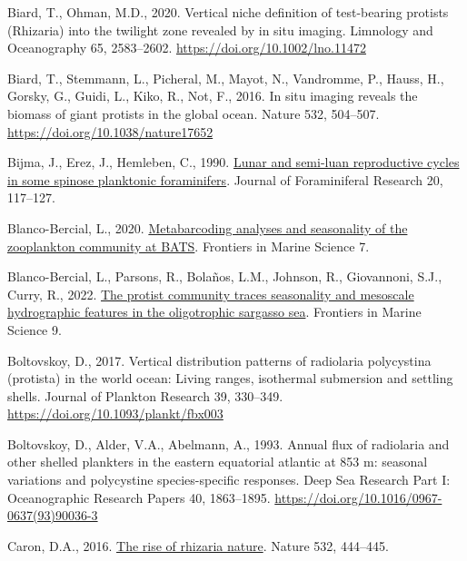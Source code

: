 \documentclass[
]{article}
\newlength{\cslhangindent}
\newenvironment{CSLReferences}[2] %
 {\begin{list}{}{%
  \setlength{\itemindent}{0pt}
  \setlength{\leftmargin}{0pt}
  \setlength{\parsep}{0pt}
  \ifodd #1
   \setlength{\leftmargin}{\cslhangindent}
   \setlength{\itemindent}{-1\cslhangindent}
  \fi
  \setlength{\itemsep}{#2\baselineskip}}}
 {\end{list}}
\begin{document}
\begin{CSLReferences}{1}{0}
Biard, T., Ohman, M.D., 2020. Vertical niche definition of test-bearing
protists (Rhizaria) into the twilight zone revealed by in situ imaging.
Limnology and Oceanography 65, 2583--2602.
\url{https://doi.org/10.1002/lno.11472}

Biard, T., Stemmann, L., Picheral, M., Mayot, N., Vandromme, P., Hauss,
H., Gorsky, G., Guidi, L., Kiko, R., Not, F., 2016. In situ imaging
reveals the biomass of giant protists in the global ocean. Nature 532,
504--507. \url{https://doi.org/10.1038/nature17652}

Bijma, J., Erez, J., Hemleben, C., 1990.
\href{https://epic.awi.de/id/eprint/6096/1/Bij1990a.pdf}{Lunar and
semi-luan reproductive cycles in some spinose planktonic foraminifers}.
Journal of Foraminiferal Research 20, 117--127.

Blanco-Bercial, L., 2020.
\href{https://www.frontiersin.org/articles/10.3389/fmars.2020.00173}{Metabarcoding
analyses and seasonality of the zooplankton community at BATS}.
Frontiers in Marine Science 7.

Blanco-Bercial, L., Parsons, R., Bolaños, L.M., Johnson, R., Giovannoni,
S.J., Curry, R., 2022.
\href{https://www.frontiersin.org/articles/10.3389/fmars.2022.897140}{The
protist community traces seasonality and mesoscale hydrographic features
in the oligotrophic sargasso sea}. Frontiers in Marine Science 9.

Boltovskoy, D., 2017. Vertical distribution patterns of radiolaria
polycystina (protista) in the world ocean: Living ranges, isothermal
submersion and settling shells. Journal of Plankton Research 39,
330--349. \url{https://doi.org/10.1093/plankt/fbx003}

Boltovskoy, D., Alder, V.A., Abelmann, A., 1993. Annual flux of
radiolaria and other shelled plankters in the eastern equatorial
atlantic at 853 m: seasonal variations and polycystine species-specific
responses. Deep Sea Research Part I: Oceanographic Research Papers 40,
1863--1895. \url{https://doi.org/10.1016/0967-0637(93)90036-3}

Caron, D.A., 2016.
\href{https://www.nature.com/articles/nature17892}{The rise of rhizaria
\textbar{} nature}. Nature 532, 444--445.


\end{CSLReferences}
\end{document}
